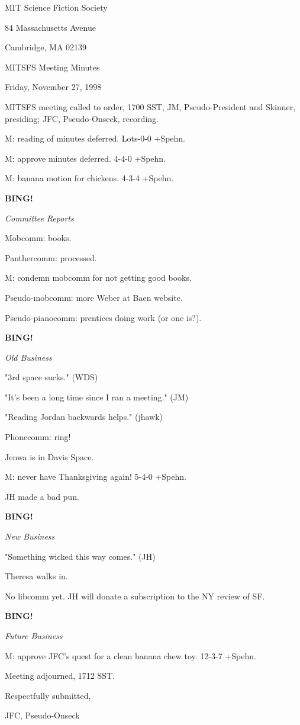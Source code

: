\documentclass[12pt]{article}
\newcommand{\bing}{{\bf BING!} }
\newcommand{\goto}[1]{\bing \vskip 12pt \centerline{{\em{#1}}}}
\begin{document}
\begin{center}

MIT Science Fiction Society 

84 Massachusetts Avenue

Cambridge, MA 02139

\vspace{12pt}

MITSFS Meeting Minutes 

Friday, November 27, 1998

\end{center}
 
\vspace{18pt}

\setlength{\parskip}{6pt}

\noindent
MITSFS meeting called to order, 1700 SST,
JM, Pseudo-President and Skinner, presiding; JFC, Pseudo-Onseck, recording.

M: reading of minutes deferred. Lots-0-0 +Spehn.

M: approve minutes deferred. 4-4-0 +Spehn.

M: banana motion for chickens. 4-3-4 +Spehn.

\goto{Committee Reports}

Mobcomm: books.

Panthercomm: processed.

M: condemn mobcomm for not getting good books.

Pseudo-mobcomm: more Weber at Baen website.

Pseudo-pianocomm: prentices doing work (or one is?).

\goto{Old Business}

"3rd space sucks." (WDS)

"It's been a long time since I ran a meeting." (JM)

"Reading Jordan backwards helps." (jhawk)

Phonecomm: ring!

Jenwa is in Davis Space.

M: never have Thanksgiving again! 5-4-0 +Spehn.

JH made a bad pun.

\goto{New Business}

"Something wicked this way comes." (JH)

Theresa walks in.

No libcomm yet. JH will donate a subscription to the NY review of SF.

\goto{Future Business}

M: approve JFC's quest for a clean banana chew toy. 12-3-7 +Spehn.

\vspace{12pt}

\noindent
Meeting adjourned, 1712 SST.

\vspace{18pt}

\centerline{Respectfully submitted,}
\centerline{JFC, Pseudo-Onseck}
\end{document}
